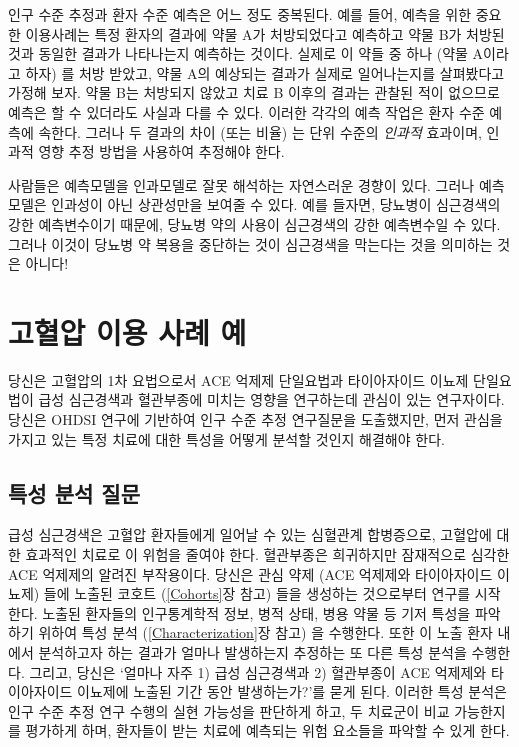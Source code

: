 \documentclass[11pt]{book}
\theoremstyle{definition}
\theoremstyle{definition}
\theoremstyle{definition}
\theoremstyle{remark}
\let\BeginKnitrBlock\begin \let\EndKnitrBlock\end
\begin{document}
인구 수준 추정과 환자 수준 예측은 어느 정도 중복된다. 예를 들어, 예측을
위한 중요한 이용사례는 특정 환자의 결과에 약물 A가 처방되었다고 예측하고
약물 B가 처방된 것과 동일한 결과가 나타나는지 예측하는 것이다. 실제로 이
약들 중 하나 (약물 A이라고 하자) 를 처방 받았고, 약물 A의 예상되는
결과가 실제로 일어나는지를 살펴봤다고 가정해 보자. 약물 B는 처방되지
않았고 치료 B 이후의 결과는 관찰된 적이 없으므로 예측은 할 수 있더라도
사실과 다를 수 있다. 이러한 각각의 예측 작업은 환자 수준 예측에 속한다.
그러나 두 결과의 차이 (또는 비율) 는 단위 수준의 \emph{인과적} 효과이며,
인과적 영향 추정 방법을 사용하여 추정해야 한다.

\BeginKnitrBlock{rmdimportant}
사람들은 예측모델을 인과모델로 잘못 해석하는 자연스러운 경향이 있다.
그러나 예측 모델은 인과성이 아닌 상관성만을 보여줄 수 있다. 예를 들자면,
당뇨병이 심근경색의 강한 예측변수이기 때문에, 당뇨병 약의 사용이
심근경색의 강한 예측변수일 수 있다. 그러나 이것이 당뇨병 약 복용을
중단하는 것이 심근경색을 막는다는 것을 의미하는 것은 아니다!
\EndKnitrBlock{rmdimportant}

\section{고혈압 이용 사례 예}\label{---}

당신은 고혈압의 1차 요법으로서 ACE 억제제 단일요법과 타이아자이드 이뇨제
단일요법이 급성 심근경색과 혈관부종에 미치는 영향을 연구하는데 관심이
있는 연구자이다. 당신은 OHDSI 연구에 기반하여 인구 수준 추정 연구질문을
도출했지만, 먼저 관심을 가지고 있는 특정 치료에 대한 특성을 어떻게
분석할 것인지 해결해야 한다.

\subsection{특성 분석 질문}\label{--}

급성 심근경색은 고혈압 환자들에게 일어날 수 있는 심혈관계 합병증으로,
고혈압에 대한 효과적인 치료로 이 위험을 줄여야 한다. 혈관부종은
희귀하지만 잠재적으로 심각한 ACE 억제제의 알려진 부작용이다. 당신은 관심
약제 (ACE 억제제와 타이아자이드 이뇨제) 들에 노출된 코호트
(\ref{Cohorts}장 참고) 들을 생성하는 것으로부터 연구를 시작한다. 노출된
환자들의 인구통계학적 정보, 병적 상태, 병용 약물 등 기저 특성을 파악하기
위하여 특성 분석 (\ref{Characterization}장 참고) 을 수행한다. 또한 이
노출 환자 내에서 분석하고자 하는 결과가 얼마나 발생하는지 추정하는 또
다른 특성 분석을 수행한다. 그리고, 당신은 `얼마나 자주 1) 급성
심근경색과 2) 혈관부종이 ACE 억제제와 타이아자이드 이뇨제에 노출된 기간
동안 발생하는가?'를 묻게 된다. 이러한 특성 분석은 인구 수준 추정 연구
수행의 실현 가능성을 판단하게 하고, 두 치료군이 비교 가능한지를 평가하게
하며, 환자들이 받는 치료에 예측되는 위험 요소들을 파악할 수 있게 한다.
\end{document}
